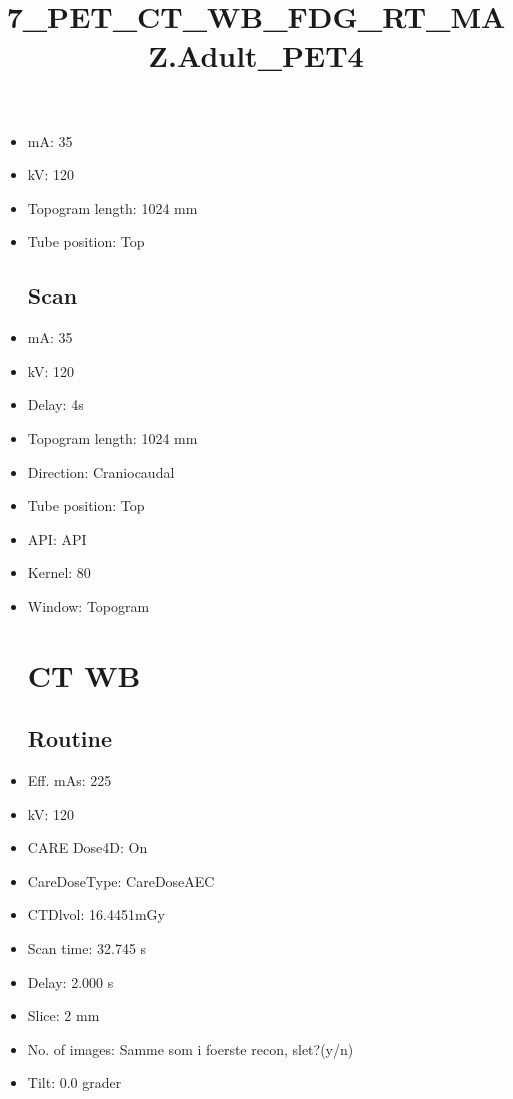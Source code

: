\documentclass[12pt]{article}
\title{7\_PET\_CT\_WB\_FDG\_RT\_MAZ.Adult\_PET4}
\begin{document}
\maketitle
\newpage
\tableofcontents
\newpage
{}


\begin{itemize}[noitemsep]\section{Topogram}
\subsection{Routine}
\item mA: 35\item kV: 120\item Topogram length: 1024 mm\item Tube position: Top
\subsection{Scan}\item mA: 35\item kV: 120\item Delay: 4s\item Topogram length: 1024 mm\item Direction: Craniocaudal\item Tube position: Top\item API: API \item Kernel: 80\item Window: Topogram
\section{CT WB}
\subsection{Routine}
\item Eff. mAs: 225\item kV: 120\item CARE Dose4D: On\item CareDoseType: CareDoseAEC\item CTDlvol: 16.4451mGy\item Scan time: 32.745 s\item Delay: 2.000 s\item Slice: 2 mm\item No. of images: Samme som i foerste recon, slet?(y/n)\item Tilt: 0.0 grader

\end{itemize}
\end{document}
